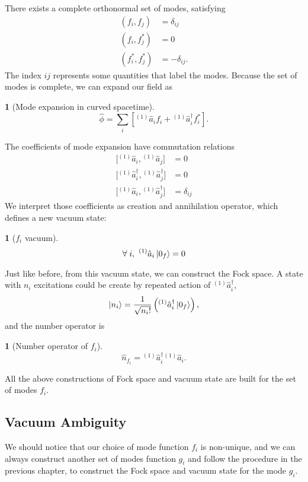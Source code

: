 \documentclass[12pt]{article}
\numberwithin{equation}{section}
\theoremstyle{1style}
\newtheorem{cthm}[equation]{}
\begin{document}
There exists a complete orthonormal set of modes, satisfying
\begin{align}\label{orf}
  \left(f_{i},f_{j}\right)     & =\delta_{ij}   \\
  \left(f_{i},f^*_{j}\right)   & =0             \\
  \left(f^*_{i},f^*_{j}\right) & =-\delta_{ij}.
\end{align}
The index \(ij\) represents some quantities that label the modes.
Because the set of modes is complete, we can expand our field as
\begin{cthm}[Mode expansion in curved spacetime]\label{cme}
  \[\hat{\phi}=\sum_i\left[{}^{(1)}\hat{a}_i f_i+{}^{(1)}\hat{a}_i^\dagger f_i^*\right].\]
\end{cthm}
The coefficients of mode expansion have commutation relations
\begin{align}
  \bigl[{}^{(1)}\hat{a}_{i},{}^{(1)}\hat{a}_{j}\bigr]                     & =0           \\
  \bigl[{}^{(1)}\hat{a}^{\dagger}_{i},{}^{(1)}\hat{a}^{\dagger}_{j}\bigr] & =0           \\
  \bigl[{}^{(1)}\hat{a}_{i},{}^{(1)}\hat{a}^{\dagger}_{j}\bigr]           & =\delta_{ij}
\end{align}
We interpret those coefficients as creation and annihilation operator, which defines a new vacuum state:
\begin{cthm}[\(f_i\) vacuum]
  \[\forall\;i,\ {}^{(1)}\hat{a}_i\ket{0_f}=0\]
\end{cthm}
Just like before, from this vacuum state, we can construct the Fock space.
A state with \(n_i\) excitations could be create by repeated action of \({}^{(1)}\hat{a}^\dagger_i\),
\begin{equation}
  \ket{n_i}=\frac{1}{\sqrt{n_i!}}\left({}^{(1)}\hat{a}_i^{\dagger}\ket{0_f}\right),
\end{equation}
and the number operator is
\begin{cthm}[Number operator of \(f_i\)]
  \[\hat{n}_{f_i}={}^{(1)}\hat{a}_i^\dagger {}^{(1)}\hat{a}_i.\]
\end{cthm}

All the above constructions of Fock space and vacuum state are built for the set of modes \(f_i\).


\subsection{Vacuum Ambiguity}
We should notice that our choice of mode function \(f_i\) is non-unique, and we can always construct another set of modes function
\(g_i\) and follow the procedure in the previous chapter, to construct the Fock space and vacuum state for the mode \(g_i\).
\end{document}

